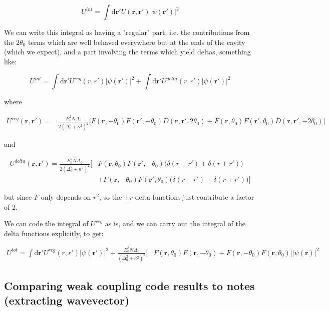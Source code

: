 \documentclass[a4paper,nobalancelastpage]{revtex4-1}
\newcommand{\vect}[1]{\bm{#1}}
\newcommand{\abs}[1]{\lvert #1 \rvert}
\begin{document}
\begin{equation}
U^{int}=\int \mathrm{d} \vect{r}' U(\vect{r},\vect{r}') \abs{\psi(\vect{r}')}^2
\end{equation}

 We can write this integral as having a "regular" part, i.e. the contributions from the $2\theta_0$ terms which are well behaved everywhere but at the ends of the cavity (which we expect), and a part involving the terms which yield deltas, something like:

\begin{equation}
U^{int}=\int \mathrm{d} \vect{r}' U^{reg}(r,r')|\psi(\vect{r}')|^2 +\int \mathrm{d} \vect{r}' U^{delta}(r,r') \abs{\psi(\vect{r}')}^2
\end{equation}

where

\begin{align}
U^{reg}(\vect{r},\vect{r}')=&\frac{ E^2_0 N \Delta_0 }{2(\Delta_0^2+\kappa^2)^2} 
\bigg[
F(\vect{r},-\theta_0)F(\vect{r}',-\theta_0)D(\vect{r},\vect{r}',2\theta_0) 
+ F(\vect{r},\theta_0)F(\vect{r}',\theta_0)D(\vect{r},\vect{r}',-2\theta_0) \nonumber 
\bigg]
\end{align}

and 

\begin{align}
U^{delta}(\vect{r},\vect{r}')=\frac{ E^2_0 N \Delta_0 }{2(\Delta_0^2+\kappa^2)^2} 
\bigg[&
F(\vect{r},\theta_0)F(\vect{r}',-\theta_0)
\big(\delta(r-r')+\delta(r+r') \big)
\\&+ F(\vect{r},-\theta_0)F(\vect{r}',\theta_0) \big(\delta(r-r')+\delta(r+r') \big) \nonumber 
\bigg]
\end{align}

but since $F$ only depends on $r^2$, so the $\pm r$ delta functions just contribute a factor of 2.

We can code the integral of $U^{reg}$ as is, and we can carry out the integral of the delta functions explicitly, to get:


\begin{align}
\label{eq:Utot}
U^{tot}=
\int \mathrm{d} \vect{r}' U^{reg}(r,r')|\psi(\vect{r}')|^2 +\frac{ E^2_0 N \Delta_0 }{(\Delta_0^2+\kappa^2)^2} 
\bigg[&
F(\vect{r},\theta_0)F(\vect{r},-\theta_0)+ F(\vect{r},-\theta_0)F(\vect{r},\theta_0) \nonumber 
\bigg]|\psi(\vect{r})|^2
\end{align}

\subsection{Comparing weak coupling code results to notes (extracting wavevector)}
\end{document}
